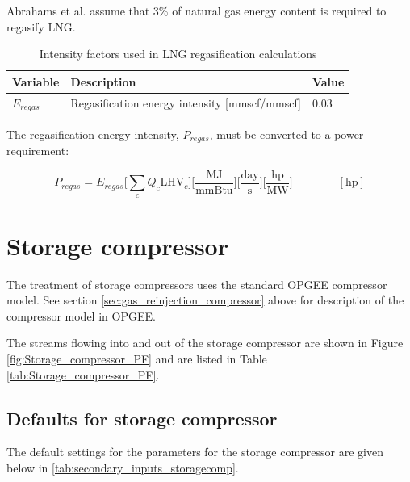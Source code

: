 \documentclass[11pt]{report}
\newcommand{\eqnunit}[1]{\quad\quad \scriptstyle{\left[\text{#1}\right]}}
\begin{document}
Abrahams et al. \cite{abrahams2015} assume that 3\% of natural gas energy content is required to regasify LNG.

\begin{table}[ht]
\begin{scriptsize}
\caption{Intensity factors used in LNG regasification calculations}
\label{tab:regas}
\begin{tabular*}{0.8\columnwidth}{p{}p{}p{}}
\toprule
Variable & Description & Value \\
\midrule
$E_{regas}$ & Regasification energy intensity [mmscf/mmscf] & 0.03 \\
\bottomrule
\end{tabular*}
\end{scriptsize}
\end{table}

The regasification energy intensity, $P_{regas}$, must be converted to a power requirement:

\begin{equation}
P_{regas} = E_{regas} \Big[\sum_c Q_{c} \textrm{LHV}_{c} \Big] \Big[\frac{\textrm{MJ}}{\textrm{mmBtu}} \Big] \Big[\frac{\textrm{day}}{\textrm{s}} \Big] \Big[\frac{\textrm{hp}}{\textrm{MW}} \Big] \quad\quad\eqnunit{hp}
\end{equation}

\clearpage

\section{Storage compressor}
\label{sec:storage_compressor}

The treatment of storage compressors uses the standard OPGEE compressor model. See section \ref{sec:gas_reinjection_compressor} above for description of the compressor model in OPGEE.

The streams flowing into and out of the storage compressor are shown in Figure \ref{fig:Storage_compressor_PF} and are listed in Table \ref{tab:Storage_compressor_PF}.

\subsection{Defaults for storage compressor}

The default settings for the parameters for the storage compressor are given below in \ref{tab:secondary_inputs_storagecomp}.
 
\end{document}
